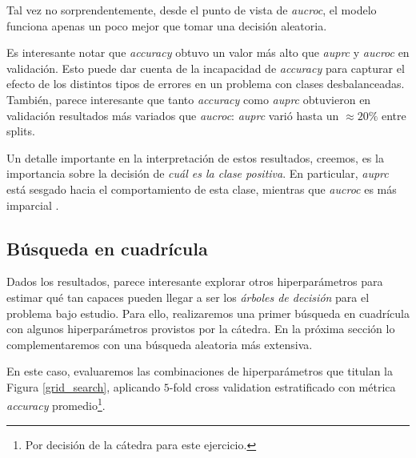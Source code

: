 Tal vez no sorprendentemente, desde el punto de vista de \textit{aucroc}, el modelo funciona apenas un poco mejor que tomar una decisión aleatoria.

Es interesante notar que \textit{accuracy} obtuvo un valor más alto que \textit{auprc} y \textit{aucroc} en validación. Esto puede dar cuenta de la incapacidad de \textit{accuracy} para capturar el efecto de los distintos tipos de errores en un problema con clases desbalanceadas. También, parece interesante que tanto \textit{accuracy} como \textit{auprc} obtuvieron en validación resultados más variados que \textit{aucroc}: \textit{auprc} varió hasta un $\approx 20\%$ entre splits.

Un detalle importante en la interpretación de estos resultados, creemos, es la importancia sobre la decisión de \textit{cuál es la clase positiva}. En particular, \textit{auprc} está sesgado hacia el comportamiento de esta clase, mientras que \textit{aucroc} es más imparcial \cite{Saito}. 


\subsection{Búsqueda en cuadrícula}

Dados los resultados, parece interesante explorar otros hiperparámetros para estimar qué tan capaces pueden llegar a ser los \textit{árboles de decisión} para el problema bajo estudio. Para ello, realizaremos una primer búsqueda en cuadrícula con algunos hiperparámetros provistos por la cátedra. En la próxima sección lo complementaremos con una búsqueda aleatoria más extensiva.

En este caso, evaluaremos las combinaciones de hiperparámetros que titulan la Figura \ref{grid_search}, aplicando $5$-fold cross validation estratificado con métrica \textit{accuracy} promedio\footnote{Por decisión de la cátedra para este ejercicio.}.

